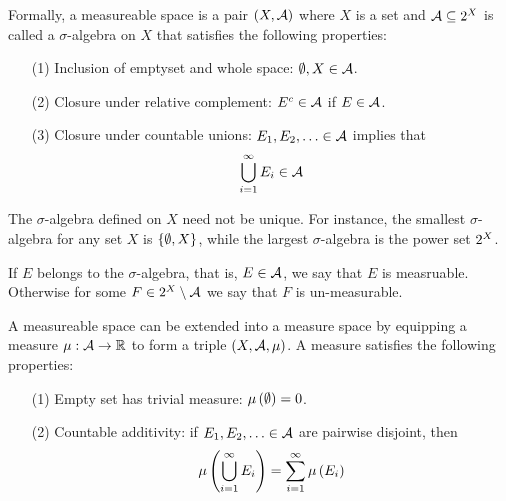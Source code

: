 Formally, a measureable space is a pair
\(\left(X, \mathcal{A}\right)\) where
\(X\) is a set and \(\mathcal{A} \subseteq 2^{X}\) is called
a \(\sigma\)-algebra on \(X\) that satisfies the following properties:
\begin{enumerate}
  \item[(1)]
    Inclusion of emptyset and whole space: \(\emptyset, X \in \mathcal{A}\).

  \item[(2)]
    Closure under relative complement:
    \(E^c \in \mathcal{A}\) if \(E \in \mathcal{A}\).

  \item[(3)]
    Closure under countable unions:
    \(E_1, E_2, \ldots \in \mathcal{A}\) implies that
    \begin{align*}
      \bigcup_{i = 1}^{\infty} E_i \in \mathcal{A}
    \end{align*}

\end{enumerate}

The \(\sigma\)-algebra defined on \(X\) need not be unique.
For instance, the smallest \(\sigma\)-algebra for any set \(X\)
is \(\left\{\emptyset, X\right\}\),
while the largest \(\sigma\)-algebra is the power set \(2^{X}\).

If \(E\) belongs to the \(\sigma\)-algebra,
that is, \(E \in \mathcal{A}\), we say that \(E\) is measruable.
Otherwise for some \(F \in 2^{X} \setminus \mathcal{A}\)
we say that \(F\) is un-measurable.

A measureable space can be extended into a measure space by equipping a
measure \(\mu : \mathcal{A} \to \mathbb{R}\) to form a triple
\(\left(X, \mathcal{A}, \mu\right)\).
A measure satisfies the following properties:
\begin{enumerate}
  \item[(1)]
    Empty set has trivial measure: \(\mu\left(\emptyset\right) = 0\).

  \item[(2)]
    Countable additivity:
    if \(E_1, E_2, \ldots \in \mathcal{A}\) are pairwise disjoint, then
    \begin{align*}
      \mu\left(\bigcup_{i = 1}^{\infty} E_i\right)
        = \sum_{i = 1}^{\infty} \mu\left(E_i\right)
    \end{align*}

\end{enumerate}


